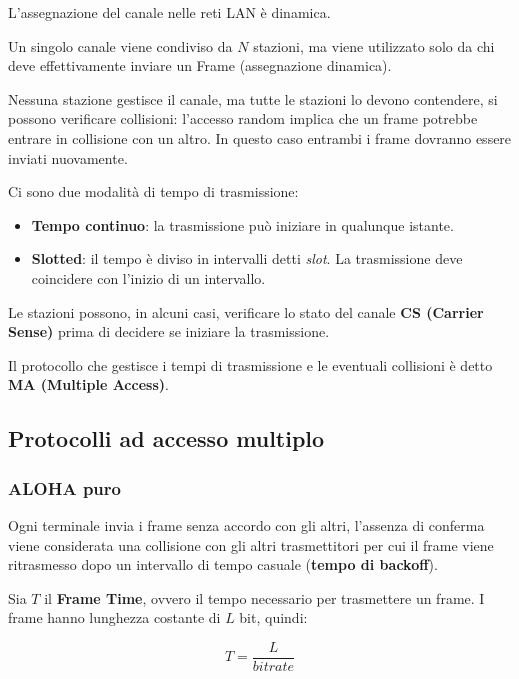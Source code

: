             L'assegnazione del canale nelle reti LAN è dinamica.

            Un singolo canale viene condiviso da $N$ stazioni, ma viene utilizzato solo da chi deve effettivamente inviare un Frame (assegnazione dinamica).

            Nessuna stazione gestisce il canale, ma tutte le stazioni lo devono contendere, si possono verificare collisioni: l'accesso random implica che un frame potrebbe entrare in collisione con un altro. In questo caso entrambi i frame dovranno essere inviati nuovamente.

            Ci sono due modalità di tempo di trasmissione:
            \begin{itemize}
                \item \textbf{Tempo continuo}: la trasmissione può iniziare in qualunque istante.
                \item \textbf{Slotted}: il tempo è diviso in intervalli detti \textit{slot}. La trasmissione deve coincidere con l'inizio di un intervallo.
            \end{itemize}

            Le stazioni possono, in alcuni casi, verificare lo stato del canale \textbf{CS (Carrier Sense)} prima di decidere se iniziare la trasmissione.

            Il protocollo che gestisce i tempi di trasmissione e le eventuali collisioni è detto \textbf{MA (Multiple Access)}.

    \subsection{Protocolli ad accesso multiplo}
        \subsubsection{ALOHA puro}
            Ogni terminale invia i frame senza accordo con gli altri, l'assenza di conferma viene considerata una collisione con gli altri trasmettitori per cui il frame viene ritrasmesso dopo un intervallo di tempo casuale (\textbf{tempo di backoff}).

            Sia $T$ il \textbf{Frame Time}, ovvero il tempo necessario per trasmettere un frame. I frame hanno lunghezza costante di $L$ bit, quindi:

            \begin{equation*}
                T = \frac{L}{bitrate}
            \end{equation*}

